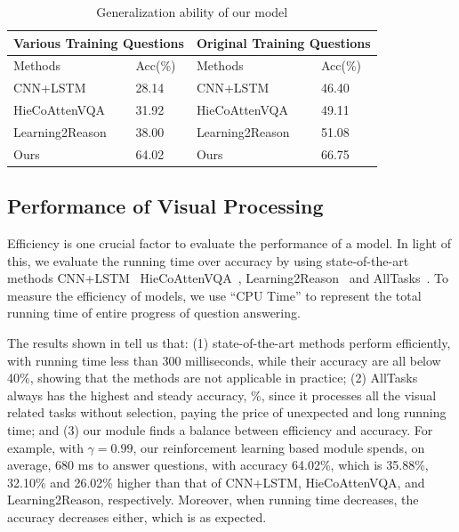 \begin{table}[h]
	\small
	\begin{tabular}{|l|l||l|l|}
		\hline
		\multicolumn{2}{|l||}{Various Training Questions} & \multicolumn{2}{l|}{Original Training Questions} \\ \hline \hline
		Methods                  & Acc(\%)            & Methods                   & Acc(\%)             \\ \hline
		CNN+LSTM                    & 28.14              & CNN+LSTM                     & 46.40               \\ \hline
		HieCoAttenVQA               & 31.92              & HieCoAttenVQA                & 49.11               \\ \hline
		Learning2Reason             & 38.00              & Learning2Reason              & 51.08               \\ \hline
		Ours                        & 64.02              & Ours                         & 66.75               \\ \hline
	\end{tabular}
	\caption{Generalization ability of our model} \label{table:genralization}
\end{table}


\subsection{Performance of Visual Processing}

Efficiency is one crucial factor to evaluate the performance of a \vqa model. 
In light of this, we evaluate the running time over accuracy by using state-of-the-art methods CNN+LSTM~\cite{VQA} HieCoAttenVQA~\cite{Lu2016Hie}, Learning2Reason~\cite{hu2017learning} and AllTasks~\cite{peixi2019}. To measure the efficiency of \vqa models, we use ``CPU Time'' to represent the total running time of entire progress of question answering. 

The results shown in  tell us that: (1) state-of-the-art methods perform efficiently, with running time less than 300 milliseconds, while their accuracy are all below 40\%, showing that the methods are not applicable in practice; (2) AllTasks always has the highest and steady accuracy, \%, since it processes all the visual related tasks without selection, paying the price of unexpected and long running time; and (3) our module finds a balance between efficiency and accuracy. For example, with $\gamma=0.99$, our reinforcement learning based module spends, on average, 680 ms to answer questions, with accuracy 64.02\%, which is 35.88\%, 32.10\% and 26.02\% higher than that of CNN+LSTM, HieCoAttenVQA, and Learning2Reason, respectively. Moreover, when running time decreases, the accuracy decreases either, which is as expected.


